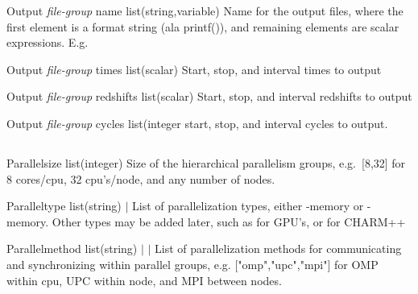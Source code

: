 \documentclass{book}
\begin{document}
\Parameter
{Output}
{\textit{file-group}}
{name}
{list(string,variable)}
{}
{Name for the output files, where the first element is a format string (ala printf()), and remaining elements are scalar expressions. E.g. \code{["wave\_pool-t=\%3.1f.data", t]}}
{}
{}

\Parameter
{Output}
{\textit{file-group}}
{times}
{list(scalar)}
{}
{Start, stop, and interval times to output}
{}
{}

\Parameter
{Output}
{\textit{file-group}}
{redshifts}
{list(scalar)}
{}
{Start, stop, and interval redshifts to output}
{}
{}

\Parameter
{Output}
{\textit{file-group}}
{cycles}
{list(integer}
{}
{start, stop, and interval cycles to output. }
{}
{}

\subsection{}

\Parameter
{Parallel}{}{size}
{list(integer)}{}
{Size of the hierarchical parallelism groups, e.g.~[8,32] for 8 cores/cpu, 32 cpu's/node, and any number of nodes.}
{}
{}

\Parameter
{Parallel}{}{type}
{list(string)}
{ $|$ }
{List of parallelization types, either -memory or -memory. Other types may be added later, such as  for GPU's, or  for CHARM++}
{}
{}

\Parameter
{Parallel}{}{method}
{list(string)}
{ $|$  $|$ }
{List of parallelization methods for communicating and synchronizing within parallel groups, e.g. ["omp","upc","mpi"] for OMP within cpu, UPC within node, and MPI between nodes.}
{}
{}
\end{document}
